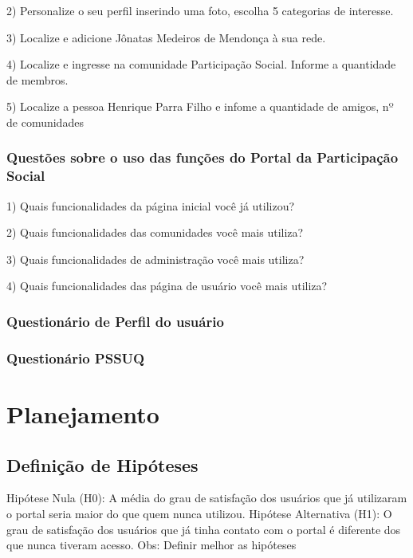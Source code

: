 2) Personalize o seu perfil inserindo uma foto, escolha 5 categorias de interesse.

3) Localize e adicione Jônatas Medeiros de Mendonça à sua rede.

4) Localize e ingresse na comunidade Participação Social. Informe a quantidade de membros.

5) Localize a pessoa Henrique Parra Filho e infome a quantidade de amigos, nº de comunidades 

\subsubsection{Questões sobre o uso das funções do Portal da Participação Social}

1) Quais funcionalidades da página inicial você já utilizou?

2) Quais funcionalidades das comunidades você mais utiliza? 

3) Quais funcionalidades de administração você mais utiliza?

4) Quais funcionalidades das página de usuário você mais utiliza? 


\subsubsection{Questionário de Perfil do usuário}


\subsubsection{Questionário PSSUQ}


\section{Planejamento}

\subsection{Definição de Hipóteses}

Hipótese Nula (H0): A média do grau de satisfação dos usuários que já utilizaram o portal seria maior do que quem nunca utilizou.
Hipótese Alternativa (H1): O grau de satisfação dos usuários que já tinha contato com o portal é diferente dos que nunca tiveram acesso.
Obs: Definir melhor as hipóteses

